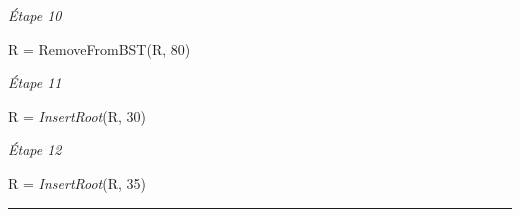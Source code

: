 \documentclass[11pt,a4paper]{article}
\begin{document}
\begin{center}
\begin{table}[ht!]
\begin{minipage}{0.50\textwidth}
  \end{minipage}
  \hfillx
  \begin{minipage}{0.50\textwidth}
    \centering

\textit{\'Etape 10}

R = RemoveFromBST(R, 80)

\vspace*{7cm}

  \end{minipage}
\end{table}

\clearpage


\begin{table}[ht!]
  \centering
  \begin{minipage}{0.50\textwidth}
    \centering

\textit{\'Etape 11}

R = \textit{InsertRoot}(R, 30)

\vspace*{7cm}

  \end{minipage}
  \hfillx
  \begin{minipage}{0.50\textwidth}
    \centering

\textit{\'Etape 12}

R = \textit{InsertRoot}(R, 35)

\vspace*{7cm}

  \end{minipage}
\end{table}

\vspace*{-0.5cm}
\rule{1.0\linewidth}{0.75pt}

%
%
%
%
%

\end{center}

\end{document}
